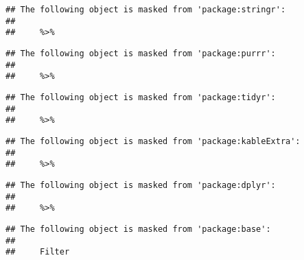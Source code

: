 \documentclass[]{article}
\begin{document}
\begin{verbatim}
## The following object is masked from 'package:stringr':
## 
##     %>%
\end{verbatim}

\begin{verbatim}
## The following object is masked from 'package:purrr':
## 
##     %>%
\end{verbatim}

\begin{verbatim}
## The following object is masked from 'package:tidyr':
## 
##     %>%
\end{verbatim}

\begin{verbatim}
## The following object is masked from 'package:kableExtra':
## 
##     %>%
\end{verbatim}

\begin{verbatim}
## The following object is masked from 'package:dplyr':
## 
##     %>%
\end{verbatim}

\begin{verbatim}
## The following object is masked from 'package:base':
## 
##     Filter
\end{verbatim}
\end{document}
